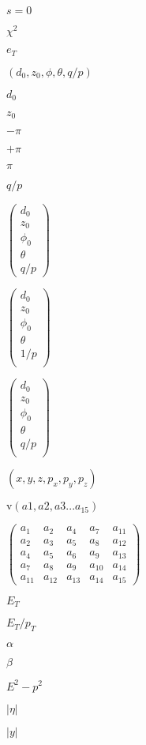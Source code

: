 \documentclass{article}
\begin{document}
$ s = 0 $
\pagebreak

$ \chi^2 $
\pagebreak

$e_T$
\pagebreak

$( d_0, z_0, \phi, \theta, q/p )$
\pagebreak

$d_0$
\pagebreak

$z_0$
\pagebreak

$-\pi$
\pagebreak

$+\pi$
\pagebreak

$\pi$
\pagebreak

$q/p$
\pagebreak

$\left(\begin{array}{c}d_0\\z_0\\\phi_0\\\theta\\q/p\end{array}\right)$
\pagebreak

$\left(\begin{array}{c}d_0\\z_0\\\phi_0\\\theta\\1/p\\\end{array}\right)$
\pagebreak

$\left(\begin{array}{c}d_0\\z_0\\\phi_0\\\theta\\q/p\\\end{array}\right)$
\pagebreak

$(x,y,z,p_x,p_y,p_z)$
\pagebreak

$\mathrm{v}(a1,a2,a3 ... a_{15})$
\pagebreak

$\left(\begin{array}{ccccc} a_1 & a_2 & a_4 & a_7 & a_{11} \\ a_2 & a_3 & a_5 & a_8 & a_{12} \\ a_4 & a_5 & a_6 & a_9 & a_{13} \\ a_7 & a_8 & a_9 & a_{10} & a_{14} \\ a_{11} & a_{12} & a_{13} & a_{14} & a_{15} \end{array}\right)$
\pagebreak

$E_T$
\pagebreak

$E_T / p_T$
\pagebreak

$\alpha$
\pagebreak

$\beta$
\pagebreak

$E^2-p^2$
\pagebreak

$|\eta|$
\pagebreak

$|y|$
\pagebreak
\end{document}
